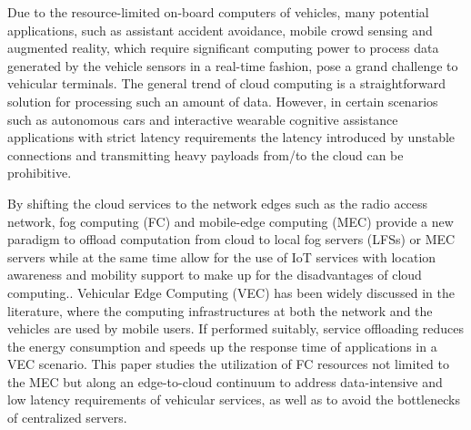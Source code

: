 \documentclass[twocolumn]{article}
\begin{document}
\par Due to the resource-limited on-board computers of vehicles, many potential applications, such as assistant accident
avoidance\cite{rani2016computer,priyanka2017sudden}, mobile crowd sensing\cite{chen2018survey} and augmented reality\cite{rameau2016real}, which require significant computing power to process data generated by the vehicle sensors in a real-time fashion\cite{lee2015development}, pose a grand challenge to vehicular terminals.
The general trend of cloud computing is a straightforward solution for processing such an amount of data. However, in certain scenarios such as autonomous cars and interactive wearable cognitive assistance applications with strict latency requirements the latency introduced by unstable connections and transmitting heavy payloads from/to the cloud can be prohibitive\cite{tarneberg2017dynamic,chen2018application,montero2017extending,byers2017architectural,chen2017empirical,azizi2019priority,ha2013impact}. 

\par By shifting the cloud services to the network edges such as the radio access network, fog computing (FC)\cite{bonomi2014fog,li2019energy} and mobile-edge computing (MEC) provide a new paradigm to offload computation from cloud to local fog servers (LFSs) or MEC  servers while at the same time allow for the use of IoT services with location awareness and mobility support to make up for the disadvantages of cloud computing\cite{satria2017recovery}.. Vehicular Edge Computing (VEC) has been widely discussed in the literature\cite{bitam2015vanet,abdelhamid2015vehicle}, where the computing infrastructures at both the network and the vehicles are used by mobile users. If performed suitably, service offloading reduces the energy consumption and speeds up the response time of applications in a VEC scenario\cite{zhang2014collaborative,lyu2016multiuser,wang2017computation}.
This paper studies the utilization of FC resources not limited to the MEC but along an edge-to-cloud continuum to address data-intensive and low latency requirements of vehicular services, as well as to avoid the bottlenecks of centralized servers.
\end{document}
